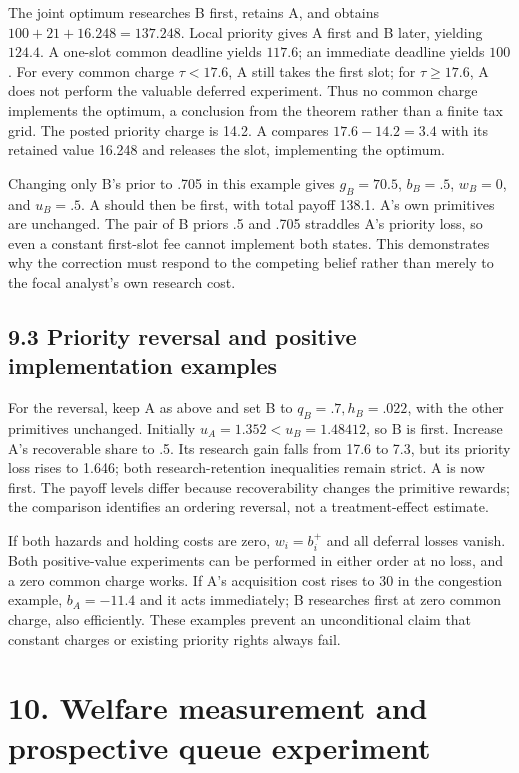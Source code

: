 \documentclass[
  11pt,
]{article}
\begin{document}
The joint optimum researches B first, retains A, and obtains
\(100+21+16.248=137.248\). Local priority gives A first and B later,
yielding \(124.4\). A one-slot common deadline yields \(117.6\); an
immediate deadline yields \(100\). For every common charge
\(\tau<17.6\), A still takes the first slot; for \(\tau\geq17.6\), A
does not perform the valuable deferred experiment. Thus no common charge
implements the optimum, a conclusion from the theorem rather than a
finite tax grid. The posted priority charge is 14.2. A compares
\(17.6-14.2=3.4\) with its retained value 16.248 and releases the slot,
implementing the optimum.

Changing only B's prior to .705 in this example gives \(g_B=70.5\),
\(b_B=.5\), \(w_B=0\), and \(u_B=.5\). A should then be first, with
total payoff 138.1. A's own primitives are unchanged. The pair of B
priors .5 and .705 straddles A's priority loss, so even a constant
first-slot fee cannot implement both states. This demonstrates why the
correction must respond to the competing belief rather than merely to
the focal analyst's own research cost.

\subsection{9.3 Priority reversal and positive implementation
examples}\label{priority-reversal-and-positive-implementation-examples}

For the reversal, keep A as above and set B to \(q_B=.7,h_B=.022\), with
the other primitives unchanged. Initially \(u_A=1.352<u_B=1.48412\), so
B is first. Increase A's recoverable share to .5. Its research gain
falls from 17.6 to 7.3, but its priority loss rises to 1.646; both
research-retention inequalities remain strict. A is now first. The
payoff levels differ because recoverability changes the primitive
rewards; the comparison identifies an ordering reversal, not a
treatment-effect estimate.

If both hazards and holding costs are zero, \(w_i=b_i^+\) and all
deferral losses vanish. Both positive-value experiments can be performed
in either order at no loss, and a zero common charge works. If A's
acquisition cost rises to 30 in the congestion example, \(b_A=-11.4\)
and it acts immediately; B researches first at zero common charge, also
efficiently. These examples prevent an unconditional claim that constant
charges or existing priority rights always fail.

\section{10. Welfare measurement and prospective queue
experiment}\label{welfare-measurement-and-prospective-queue-experiment}
\end{document}

